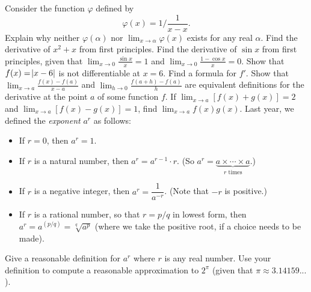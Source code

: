 \begin{questions}
\begin{multicols}{2}
    \end{multicols}
  \questioM Consider the function $ \varphi $ defined by
            \begin{displaymath}
              \varphi(x) = 1/\frac{1}{x - x}.
            \end{displaymath}
            Explain why neither $ \varphi(\alpha) $ nor $ \lim_{x \to \alpha} \varphi(x) $ exists for any real $\alpha $.
  \questioM Find the derivative of $ x^2 + x $ from first principles.
  \questioE Find the derivative of $ \sin x $ from first principles, given that $ \lim_{x \to 0} \frac{\sin x}{x} = 1 $
            and $ \lim_{x \to 0} \frac{1 - \cos x}{x} = 0 $.
  \questioE Show that $ f(x) = \abs{x - 6} $ is not differentiable at $ x = 6 $. Find a formula for $ f' $.
  \questioE Show that $ \lim_{x \to a} \frac{f(x) - f(a)}{x - a} $ and $ \lim_{h \to 0} \frac{f(a + h) - f(a)}{h} $ are
            equivalent definitions for the derivative at the point $ a $ of some function $ f $.
  \questioE If $ \lim_{x \to a} [f(x) + g(x)] = 2 $ and $ \lim_{x \to a} [f(x) - g(x)] = 1 $, find $ \lim_{x \to a} f(x)g(x) $.
  \questioS Last year, we defined the \emph{exponent} $ a^r $ as follows:
            \begin{itemize}
              \item If $ r = 0 $, then $ a^r = 1 $.
              \item If $ r $ is a natural number, then $ a^r = a^{r - 1} \cdot r $. (So $ a^r =\underbrace{a \times \cdots \times a}_{r \text{ times}} $.)
              \item If $ r $ is a negative integer, then $ a^r = \dfrac{1}{a^{-r}} $. (Note that $ -r $ is positive.)
              \item If $ r $ is a rational number, so that $ r = p/q $ in lowest form, then $ a^r = a^{(p/q)} = \sqrt[q]{a^p} $ (where we take the positive root,
                    if a choice needs to be made).
            \end{itemize}
            Give a reasonable definition for $ a^r $ where $ r $ is any real number. Use your definition to compute a reasonable approximation to $ 2^\pi $
            (given that $ \pi \approx 3.14159...$).
\end{questions}

